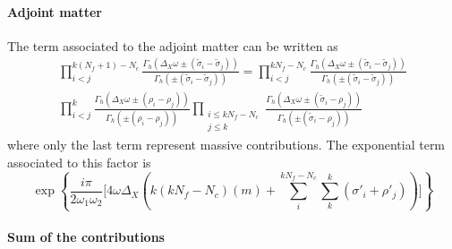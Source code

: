 \paragraph{Adjoint matter}
The term associated to the adjoint matter can be written as
\begin{multline}
 \prod_{  i<j }^{k(N_f+1)- N_c } \frac{ \Gamma_h( \Delta_X \omega \pm (\tilde{\sigma}_i - \tilde{\sigma}_j)) }{ \Gamma_h ( \pm (\tilde{\sigma}_i - \tilde{\sigma}_j) )} = 
 \prod_{i<j}^{kN_f- N_c } \frac{ \Gamma_h( \Delta_X \omega \pm (\tilde{\sigma}_i - \tilde{\sigma}_j)) }{ \Gamma_h ( \pm (\tilde{\sigma}_i - \tilde{\sigma}_j) )}
\\
 \prod_{ i<j }^{k } \frac{ \Gamma_h( \Delta_X \omega \pm (\rho_i - \rho_j)) }{ \Gamma_h ( \pm (\rho_i - \rho_j) )}
  \prod_{\substack{i \leq k N_f - N_c \\ j \leq k} } \frac{ \Gamma_h( \Delta_X \omega \pm (\tilde{\sigma}_i - \rho_j)) }{ \Gamma_h ( \pm (\tilde{\sigma}_i - \rho_j) )}
\end{multline}
where only the last term represent massive contributions. The exponential term associated to this factor is
\begin{equation}
\exp 
\left\{ \frac{i \pi}{2 \omega_1 \omega_2}
\biggl[ 
 4 \omega \Delta_X \left( k ( k N_f - N_c)   (m ) + \sum_i^{k N_f -N_c} \sum_k^{k }  ( \sigma'_i + \rho'_j)\right)
  \biggr]
  \right\}
\end{equation}

\paragraph{Sum of the contributions}










